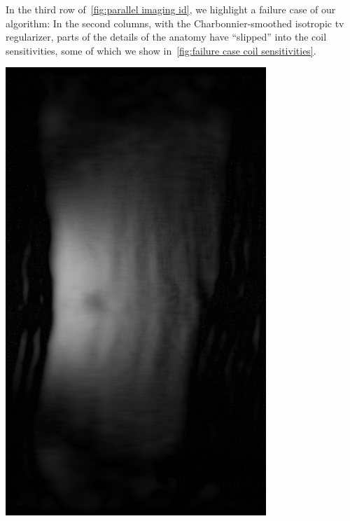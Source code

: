 In the third row of~\cref{fig:parallel imaging id}, we highlight a failure case of our algorithm:
In the second columns, with the Charbonnier-smoothed isotropic \gls{tv} regularizer, parts of the details of the anatomy have \enquote{slipped} into the coil sensitivities, some of which we show in~\cref{fig:failure case coil sensitivities}.
\begin{sidefigure}
	\centering
	\includegraphics[width=.45\marginparwidth]{failure/coil_ims_05}

\end{sidefigure}
